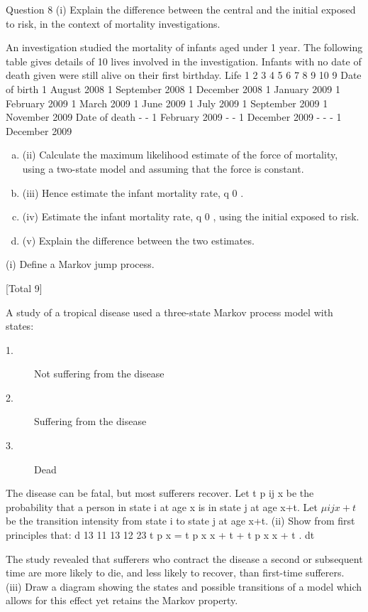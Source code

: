 \documentclass[a4paper,12pt]{article}
\begin{document}
\begin{enumerate}
Question 8
(i)
Explain the difference between the central and the initial exposed to
risk, in the context of mortality investigations.

An investigation studied the mortality of infants aged under 1 year. The following table gives details of 10 lives involved in the investigation. Infants with no date of
death given were still alive on their first birthday.
Life
1
2
3
4
5
6
7
8
9
10
9
Date of birth
1 August 2008
1 September 2008
1 December 2008
1 January 2009
1 February 2009
1 March 2009
1 June 2009
1 July 2009
1 September 2009
1 November 2009
Date of death
-
-
1 February 2009
-
-
1 December 2009
-
-
-
1 December 2009

\begin{enumerate}[(a)]
\item (ii) Calculate the maximum likelihood estimate of the force of mortality, using a
two-state model and assuming that the force is constant.
\item 
(iii) Hence estimate the infant mortality rate, q 0 .
\item 
(iv) Estimate the infant mortality rate, q 0 , using the initial exposed to risk.
\item 
(v) Explain the difference between the two estimates.
\end{enumerate}
\newpage
(i) Define a Markov jump process.

[Total 9]

A study of a tropical disease used a three-state Markov process model with states:
\begin{description}
\item[1.] Not suffering from the disease
\item[2.] Suffering from the disease
\item[3.] Dead
\end{description}
The disease can be fatal, but most sufferers recover. Let t p ij x be the probability that a
person in state i at age x is in state j at age x+t. Let $\mu ijx + t$ be the transition intensity
from state i to state j at age x+t.
(ii)
Show from first principles that:
d 13
11 13
12 23
t p x = t p x \mu x + t + t p x \mu x + t .
dt

The study revealed that sufferers who contract the disease a second or subsequent
time are more likely to die, and less likely to recover, than first-time sufferers.
(iii)
Draw a diagram showing the states and possible transitions of a model which
allows for this effect yet retains the Markov property.


\end{enumerate}
\end{document}
